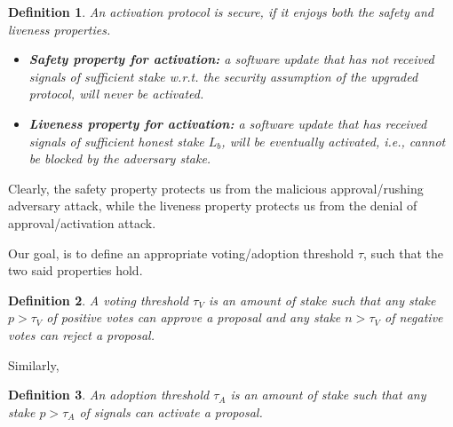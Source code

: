 \documentclass[11pt,a4paper]{article}
\newtheorem{definition}{Definition}
\begin{document}
\begin{definition}\label{def:liveness_safety_activation}
	An activation protocol is secure, if it enjoys both the safety and liveness
  properties.

	\begin{itemize}
  \item \textbf{Safety property for activation:} a software update that has not
    received signals of sufficient stake w.r.t. the security assumption of the
    upgraded protocol, will never be activated.

  \item \textbf{Liveness property for activation:} a software update that has
    received signals of sufficient honest stake $L_b$, will be eventually
    activated, i.e., cannot be blocked by the adversary stake.
	\end{itemize}
\end{definition}

Clearly, the safety property protects us from the malicious approval/rushing
adversary attack, while the liveness property protects us from the denial of
approval/activation attack.

Our goal, is to define an appropriate voting/adoption threshold $\tau$, such that
the two said properties hold.

\begin{definition} A voting threshold $\tau_V$ is an amount of stake such that
  any stake $p > \tau_V$ of positive votes can approve a proposal and any stake
  $n > \tau_V$ of negative votes can reject a proposal.
\end{definition} Similarly,

\begin{definition} An adoption threshold $\tau_A$ is an amount of stake such
  that any stake $p > \tau_A$ of signals can activate a proposal.
\end{definition}
\end{document}
